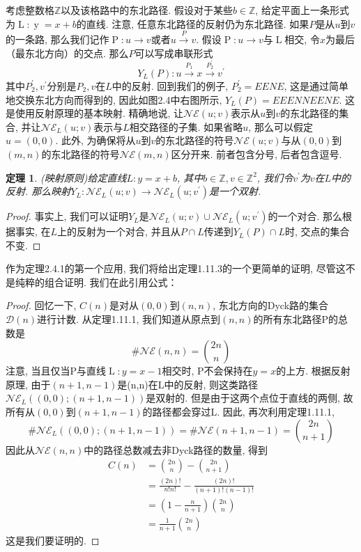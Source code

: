 \documentclass{ctexbook}
\newtheorem{thm}{定理}[section]
\begin{document}
	考虑整数格$\mathbb{Z}$以及该格路中的东北路径. 假设对于某些$b\in \mathbb{Z}$, 给定平面上一条形式为$\operatorname{L}:\operatorname{y}=x+b$的直线. 注意, 任意东北路径的反射仍为东北路径. 如果$P$是从$u$到$v$的一条路, 那么我们记作$\operatorname{P}:u\rightarrow v$或者$u\stackrel{P}{\rightarrow} v$. 假设$\operatorname{P}:u\rightarrow v$与$\operatorname{L}$相交, 令$x$为最后（最东北方向）的交点. 那么$P$可以写成串联形式
\[
	Y_{L}(P):u\stackrel{P_{1}}{\rightarrow} x\stackrel{P_{2}^{'}}{\rightarrow} v^{'}
\]
	其中$P_{2}^{'},v^{'}$分别是$P_{2},v$在$L$中的反射. 回到我们的例子, $P_{2}^{'}=EENE$, 这是通过简单地交换东北方向而得到的, 因此如图2.4中右图所示, $Y_{L}(P)=EEENNEENE$. 这是使用反射原理的基本映射. 精确地说, 让$\mathcal{N} \mathcal{E} (u;v)$表示从$u$到$v$的东北路径的集合, 并让$\mathcal{N} \mathcal{E}_{L} (u;v)$表示与$L$相交路径的子集. 如果省略$u$, 那么可以假定$u=(0, 0)$. 此外, 为确保将从$u$到$v$的东北路径的符号$\mathcal{N} \mathcal{E} (u;v)$与从$(0,0)$到$(m,n)$的东北路径的符号$\mathcal{N} \mathcal{E} (m,n)$区分开来. 前者包含分号, 后者包含逗号.
\begin{thm}
	(映射原则)给定直线${L}:y=x+b$, 其中$b\in \mathbb{Z},v\in \mathbb{Z}^{2}$, 我们令$v^{'}$为$v$在$L$中的反射. 那么映射${Y_{L}}:\mathcal{N} \mathcal{E}_{L} (u;v) \rightarrow \mathcal{N} \mathcal{E}_{L} (u;v^{'})$是一个双射.
\end{thm}
\begin{proof}
	事实上, 我们可以证明$Y_{L}$是$\mathcal{N} \mathcal{E}_{L} (u;v) \cup \mathcal{N} \mathcal{E}_{L} (u;v^{'})$的一个对合. 那么根据事实, 在$L$上的反射为一个对合, 并且从$P\cap L$传递到$Y_{L}(P)\cap L$时, 交点的集合不变.
\end{proof}
	
	作为定理2.4.1的第一个应用, 我们将给出定理1.11.3的一个更简单的证明, 尽管这不是纯粹的组合证明. 我们在此引用公式：
\begin{proof}
	回忆一下, $C(n)$是对从$(0,0)$到$(n,n)$, 东北方向的Dyck路的集合$\mathcal{D}(n)$进行计数. 从定理1.11.1, 我们知道从原点到$(n,n)$的所有东北路径P的总数是
	\[
	\# \mathcal{N} \mathcal{E} (n,n)=\binom{2n}{n}
	\]
	注意, 当且仅当P与直线$\operatorname{L}:y=x-1$相交时, P不会保持在$y=x$的上方. 根据反射原理, 由于$(n+1,n-1)$是(n,n)在L中的反射, 则这类路径$\mathcal{N} \mathcal{E}_{L} ((0,0);(n+1,n-1))$是双射的. 但是由于这两个点位于直线的两侧, 故所有从$(0,0)$到$(n+1,n-1)$的路径都会穿过L. 因此, 再次利用定理1.11.1,
	\[
	\# \mathcal{N} \mathcal{E}_{L}((0,0);(n+1,n-1))=\#\mathcal{N} \mathcal{E} (n+1,n-1)=\binom{2n}{n+1}
	\]
	因此从$\mathcal{N} \mathcal{E} (n,n)$中的路径总数减去非Dyck路径的数量, 得到
	\[
	\begin{aligned} C(n)
	&=\binom{2n}{n}-\binom{2n}{n+1}\\
	& =\frac{(2n)!}{n!n!}-\frac{(2n)!}{(n+1)!(n-1)!} \\
	& =(1-\frac{n}{n+1})\binom{2n}{n}\\
	& =\frac{1}{n+1} \binom{2n}{n}
	\end{aligned}
	\]
	这是我们要证明的. 
\end{proof}
\end{document}
